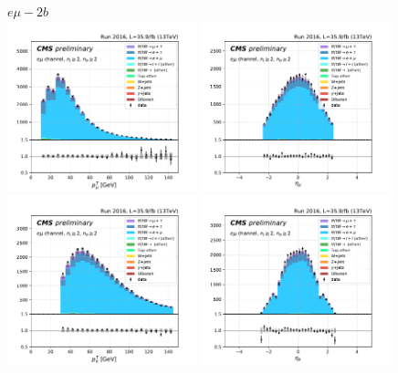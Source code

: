 \begin{figure}[ht]
    \centering
    $e\mu - 2b$ \\
    \includegraphics[width=0.49\textwidth]{chapters/Appendix/sectionPlots/figures/kinematics_pickles/emu2/2b/emu2_2b_lepton1_pt.pdf}
    \includegraphics[width=0.49\textwidth]{chapters/Appendix/sectionPlots/figures/kinematics_pickles/emu2/2b/emu2_2b_lepton1_eta.pdf}
    \includegraphics[width=0.49\textwidth]{chapters/Appendix/sectionPlots/figures/kinematics_pickles/emu2/2b/emu2_2b_lepton2_pt.pdf}
    \includegraphics[width=0.49\textwidth]{chapters/Appendix/sectionPlots/figures/kinematics_pickles/emu2/2b/emu2_2b_lepton2_eta.pdf}

\end{figure}
